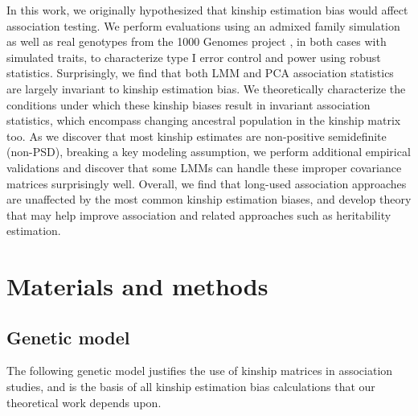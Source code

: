 \documentclass[9pt,twocolumn,twoside]{gsajnl}
\begin{document}
In this work, we originally hypothesized that kinship estimation bias would affect association testing.
We perform evaluations using an admixed family simulation \citep{yao_limitations_2022} as well as real genotypes from the 1000 Genomes project \citep{the_1000_genomes_project_consortium_map_2010, 1000_genomes_project_consortium_integrated_2012, fairley_international_2020}, in both cases with simulated traits, to characterize type I error control and power using robust statistics.
Surprisingly, we find that both LMM and PCA association statistics are largely invariant to kinship estimation bias.
We theoretically characterize the conditions under which these kinship biases result in invariant association statistics, which encompass changing ancestral population in the kinship matrix too.
As we discover that most kinship estimates are non-positive semidefinite (non-PSD), breaking a key modeling assumption, we perform additional empirical validations and discover that some LMMs can handle these improper covariance matrices surprisingly well.
Overall, we find that long-used association approaches are unaffected by the most common kinship estimation biases, and develop theory that may help improve association and related approaches such as heritability estimation.

\section{Materials and methods}


\subsection{Genetic model}

The following genetic model justifies the use of kinship matrices in association studies, and is the basis of all kinship estimation bias calculations that our theoretical work depends upon.
\end{document}
